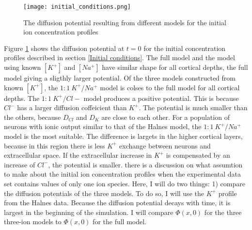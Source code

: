 \documentclass{article}
\begin{document}
\begin{figure}
  \texttt{[image: initial\_conditions.png]}
  \caption{The diffusion potential resulting from different models for the initial ion concentration profiles}
  \label{fig:initial_conditions}
\end{figure}

Figure \ref{fig:initial_conditions} shows the diffusion potential at $t=0$ for the initial concentration profiles described in section \ref{Initial conditions}. The full model and the model using known $[K^+]$ and $[Na^+]$ have similar shape for all cortical depths, the full model giving a sligthly larger potential. Of the three models constructed from known $[K^+]$, the $1\!:\!1\ K^+\!/Na^+$  model is colses to the full model for all cortical depths. The $1\!:\!1\ K^+\!/Cl-$ model produces a positive potential. This is because $Cl^-$ has a larger diffusion coffeicient than $K^+$. The potential is much smaller than the others, because $D_{Cl}$ and $D_K$ are close to each other. For a population of neurons with ionic output similar to that of the Halnes model, the $1\!:\!1\ K^+\!/Na^+$ model is the most suitable. The difference is largets in the higher cortical layers, because in this region there is less $K^+$ exchange between neurons and extracellular space.  If the extracellular increase in $K^+$ is compensated by an increase of $Cl^-$, the potential is smaller.      there is a discussion on what assumtion to make about the initial ion concentration profiles when the experimental data set contains values of only one ion species. Here, I will do two things: 1) compare the diffusion potentials of the three models. To do so, I will use the $K^+$ profile from the Halnes data. Because the diffusion potential decays with time, it is largest in the beginning of the simulation. I will compare $\Phi(x,0)$ for the three three-ion models to $\Phi(x,0)$ for the full model. 
\end{document}
